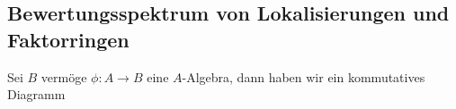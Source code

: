 \subsection*{Bewertungsspektrum von Lokalisierungen und Faktorringen}
Sei $B$ vermöge $\phi:A\to B$ eine $A$-Algebra, dann haben wir ein kommutatives Diagramm
\begin{center}
\end{center}